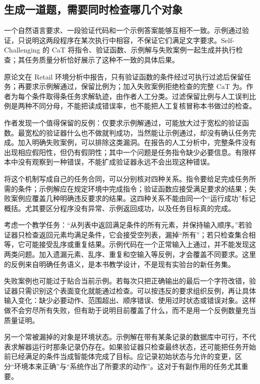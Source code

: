 \subsection{生成一道题，需要同时检查哪几个对象}
\label{sec:ch11-taskcontract}

一个自然语言要求、一段验证代码和一个示例答案能够互相不一致。示例通过验证，只说明这两段程序在某次执行中相容，不保证它们满足文字要求。Self-Challenging 的 CaT 将指令、验证函数、示例解与失败案例一起生成并执行检查；其任务质量分析恰好展示了这种不一致的具体后果\cite{self-challenging-2506}。

原论文在 Retail 环境分析中报告，只有验证函数的条件经过可执行过滤后保留任务；再要求示例解通过，保留比例为；加入失败案例拒绝检查的完整 CaT 为。作者为每个条件取得条任务求解轨迹，由作者人工分类\cite{self-challenging-2506}。过滤保留比例与人工误判比例是两种不同分母，不能把读成错误率，也不能把人工复核冒称本书做过的检查。

作者发现一个值得保留的反例：仅要求示例解通过，可能放大过于宽松的验证函数。最宽松的验证器什么也不做就判成功，当然能让示例通过，却没有确认任务完成。加入明确失败案例，可以排除这类漏洞。在报告的人工分析中，完整条件没有出现相应假阳性，但仍有假阴性；其中一个问题是任务指令缺少必要信息\cite{self-challenging-2506}。有限样本中没有观察到一种错误，不能扩成验证器永远不会出现这种错误。

将这个机制写成自己的任务合同，可以分别核对四种关系。指令要给足完成任务所需的条件；示例解应在规定环境中完成指令；验证函数应接受满足要求的结果；失败案例应覆盖几种明确违反要求的结果。这四种关系不能由同一个“运行成功”标记概括。尤其要区分程序没有异常、示例返回成功，以及任务目标真的完成。

考虑一个教学任务：“从列表中返回满足条件的所有元素，并保持输入顺序。”若验证器只检查返回元素均满足条件，它会接受空列表，漏掉“所有”；若只检查集合相等，它可能接受乱序或重复结果。示例代码在一个正常输入上通过，并不能发现这两类问题。加入遗漏元素、乱序、重复和空输入等反例，才会覆盖不同要求。这里的反例来自明确任务语义，是本书教学设计，不是现有实验台的新任务集。

失败案例也可能过于贴合当前示例。若每次只把正确输出的最后一个字符改错，验证器只需识别这个表面变化就能通过检查。可以按违反的要求组织反例，再让具体输入变化：缺少必要动作、范围超出、顺序错误、使用过时状态或错误对象。这样做不会穷尽所有失败，但有助于说明目前覆盖了什么，而不是用一个反例数量充当质量证明。

另一个常被漏掉的对象是环境状态。示例解在带有某条记录的数据库中可行，不代表求解器运行时那条记录仍存在。如果验证器只检查最终状态，还可能把任务开始前已经满足的条件当成智能体完成了目标。应记录初始状态与允许的变更，区分“环境本来正确”与“系统作出了所要求的动作”。这对于有副作用的任务尤其重要。

